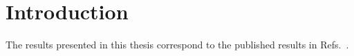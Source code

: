 \chapter{Introduction}



The results presented in this thesis correspond to the published results in Refs.~\cite{CMS:myTOPRun2,CMS:mySUSRun2PAS,CMS:myTOP2016,CMS:mySUS2016}.
